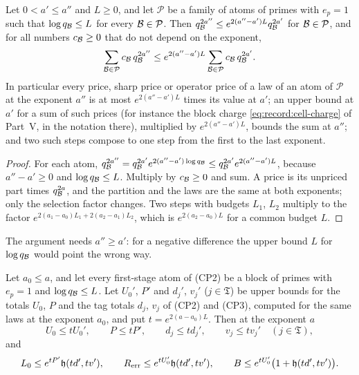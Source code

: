 \begin{lemma}[Repricing]\label{lem:record:repricing}
Let $0<a'\le a''$ and $L\ge0$, and let $\mathcal P$ be a family of atoms of
primes with $e_p=1$ such that $\log q_{\mathcal B}\le L$ for every
$\mathcal B\in\mathcal P$. Then $q_{\mathcal B}^{2a''}\le e^{2(a''-a')L}q_{\mathcal B}^{2a'}$ for
$\mathcal B\in\mathcal P$, and for all numbers $c_{\mathcal B}\ge0$ that do not depend on
the exponent,
\[
 \sum_{\mathcal B\in\mathcal P}c_{\mathcal B}\,q_{\mathcal B}^{2a''}
 \le e^{2(a''-a')L}\sum_{\mathcal B\in\mathcal P}c_{\mathcal B}\,q_{\mathcal B}^{2a'} .
\]
In particular every price, sharp price or operator price of a law of an atom
of $\mathcal P$ at the exponent $a''$ is at most $e^{2(a''-a')L}$ times its
value at $a'$; an upper bound at $a'$ for a sum of such prices (for instance
the block charge \eqref{eq:record:cell-charge} of Part~V, in the notation
there), multiplied by $e^{2(a''-a')L}$, bounds the
sum at $a''$; and two such steps compose to one step from the first to the
last exponent.
\end{lemma}

\begin{proof}
For each atom, $q_{\mathcal B}^{2a''}=q_{\mathcal B}^{2a'}e^{2(a''-a')\log q_{\mathcal B}}\le
q_{\mathcal B}^{2a'}e^{2(a''-a')L}$, because $a''-a'\ge0$ and $\log q_{\mathcal B}\le L$.
Multiply by $c_{\mathcal B}\ge0$ and sum. A price is its unpriced part times
$q_{\mathcal B}^{2a}$, and the partition and the laws are the same at both
exponents; only the selection factor changes. Two steps with budgets $L_1$,
$L_2$ multiply to the factor $e^{2(a_1-a_0)L_1+2(a_2-a_1)L_2}$, which is
$e^{2(a_2-a_0)L}$ for a common budget $L$.
\end{proof}

The argument needs $a''\ge a'$: for a negative difference the upper bound
$L$ for $\log q_{\mathcal B}$ would point the wrong way.

\begin{corollary}
\label{cor:first-stage-repricing}
Let $a_0\le a$, and let every first-stage atom of (CP2) be a block of primes
with $e_p=1$ and $\log q_{\mathcal B}\le L$. Let $U_0'$, $P'$ and $d_j'$, $v_j'$
($j\in\mathfrak T$) be upper bounds for the totals $U_0$, $P$ and the tag
totals $d_j$, $v_j$ of (CP2) and (CP3), computed for the same laws at the
exponent $a_0$, and put $t=e^{2(a-a_0)L}$. Then at the exponent $a$
\[
 U_0\le tU_0',\qquad P\le tP',\qquad d_j\le td_j',\qquad v_j\le tv_j'
 \quad(j\in\mathfrak T),
\]
and
\[
 L_0\le e^{tP'}\mathfrak h(td',tv'),\qquad
 R_{\rm err}\le e^{tU_0'}\mathfrak h(td',tv'),\qquad
 B\le e^{tU_0'}\bigl(1+\mathfrak h(td',tv')\bigr).
\]
\end{corollary}

